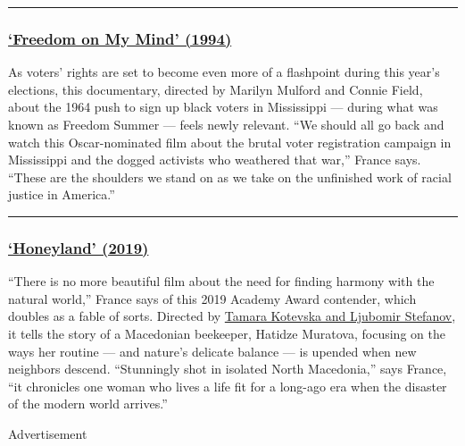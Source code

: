 \begin{center}\rule{0.5\linewidth}{\linethickness}\end{center}

\hypertarget{freedom-on-my-mind-1994}{%
\subsubsection{\texorpdfstring{\href{https://www.nytimes.com/1994/06/22/movies/review-film-freedom-on-my-mind-memories-of-a-hot-summer-long-ago.html}{`Freedom
on My Mind'
(1994)}}{`Freedom on My Mind' (1994)}}\label{freedom-on-my-mind-1994}}

As voters' rights are set to become even more of a flashpoint during
this year's elections, this documentary, directed by Marilyn Mulford and
Connie Field, about the 1964 push to sign up black voters in Mississippi
--- during what was known as Freedom Summer --- feels newly relevant.
``We should all go back and watch this Oscar-nominated film about the
brutal voter registration campaign in Mississippi and the dogged
activists who weathered that war,'' France says. ``These are the
shoulders we stand on as we take on the unfinished work of racial
justice in America.''

\begin{center}\rule{0.5\linewidth}{\linethickness}\end{center}

\hypertarget{honeyland-2019}{%
\subsubsection{\texorpdfstring{\href{https://www.nytimes.com/2019/07/25/movies/honeyland-review.html}{`Honeyland'
(2019)}}{`Honeyland' (2019)}}\label{honeyland-2019}}

``There is no more beautiful film about the need for finding harmony
with the natural world,'' France says of this 2019 Academy Award
contender, which doubles as a fable of sorts. Directed by
\href{https://www.nytimes.com/2020/01/24/movies/honeyland-oscars.html}{Tamara
Kotevska and Ljubomir Stefanov}, it tells the story of a Macedonian
beekeeper, Hatidze Muratova, focusing on the ways her routine --- and
nature's delicate balance --- is upended when new neighbors descend.
``Stunningly shot in isolated North Macedonia,'' says France, ``it
chronicles one woman who lives a life fit for a long-ago era when the
disaster of the modern world arrives.''

Advertisement

